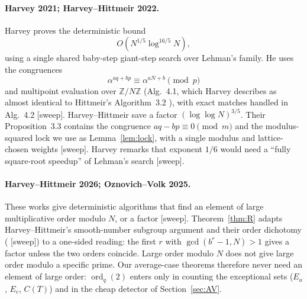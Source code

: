 \documentclass[11pt]{amsart}
\theoremstyle{definition}
\newcommand{\Z}{\mathbb{Z}}
\newcommand{\ord}{\operatorname{ord}}
\begin{document}
\paragraph{Harvey 2021; Harvey--Hittmeir 2022.}
Harvey \cite{harvey2021} proves the deterministic bound
\[O(N^{1/5}\log^{16/5}N),\]
using a single shared baby-step giant-step search over Lehman's family. He uses the congruences
\[\alpha^{aq+bp}\equiv\alpha^{aN+b}\pmod p\]
and multipoint evaluation over $\Z/N\Z$
(Alg.~4.1, which Harvey describes as almost identical to Hittmeir's Algorithm~3.2
\cite{hittmeir2018}), with exact matches handled in Alg.~4.2 [sweep]. Harvey--Hittmeir \cite{hh2022} save a
factor $(\log\log N)^{3/5}$. Their Proposition~3.3 contains the congruence $aq-bp\equiv0\pmod m$
and the modulus-squared lock we use as Lemma~\ref{lem:lock}, with a single modulus and
lattice-chosen weights [sweep]. Harvey remarks that exponent $1/6$ would need a ``fully
square-root speedup'' of Lehman's search [sweep].

\paragraph{Harvey--Hittmeir 2026; Oznovich--Volk 2025.}
These works give deterministic algorithms that find an element of large multiplicative order
modulo $N$, or a factor \cite{hh2026,oznovichvolk2025} [sweep]. Theorem~\ref{thm:R} adapts
Harvey--Hittmeir's smooth-number subgroup argument and their order dichotomy
(\cite[Lemmas~2.1, 2.3, 2.4 and \S3.1]{hh2026} [sweep]) to a one-sided reading: the first $r$
with $\gcd(b^r-1,N)>1$ gives a factor unless the two orders coincide. Large order modulo $N$ does
not give large order modulo a specific prime. Our average-case theorems therefore never need an
element of large order: $\ord_q(2)$ enters only in counting the exceptional sets ($E_a$, $E_c$,
$C(T)$) and in the cheap detector of Section~\ref{sec:AV}.
\end{document}
